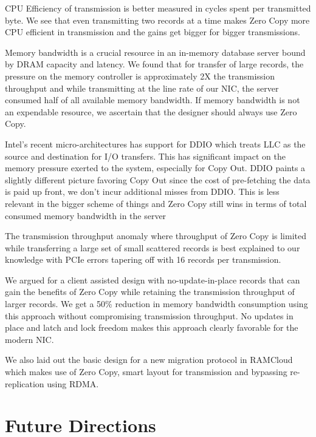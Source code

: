 CPU Efficiency of transmission is better measured in cycles spent per transmitted byte. We see that even transmitting two records at a time makes 
Zero Copy more CPU efficient in transmission and the gains get bigger for bigger transmissions.

Memory bandwidth is a crucial resource in an in-memory database server bound by DRAM capacity and latency. We found that for transfer of large 
records, the pressure on the memory controller is approximately 2X the transmission throughput and while transmitting at the line rate of our NIC, 
the server consumed half of all available memory bandwidth. If memory bandwidth is not an expendable resource, we ascertain that the designer should 
always use Zero Copy.
  
Intel\textregistered's recent micro-architectures has support for DDIO which treats LLC as the source and destination for I/O transfers. This has significant impact on 
the memory pressure exerted to the system, especially for Copy Out. DDIO paints a slightly different picture favoring Copy Out since the cost of pre-fetching the data is 
paid up front, we don't incur additional misses from DDIO. This is less relevant in the bigger scheme of things and Zero Copy still wins in terms of total 
consumed memory bandwidth in the server
  
The transmission throughput anomaly where throughput of Zero Copy is limited while transferring a large set of small scattered records is best explained to 
our knowledge with PCIe errors tapering off with 16 records per transmission.
 
We argued for a client assisted design with no-update-in-place records that can gain the benefits of Zero Copy while retaining the transmission throughput of larger records. 
We get a 50\% reduction in memory bandwidth consumption using this approach without compromising transmission throughput. 
No updates in place and latch and lock freedom makes this approach clearly favorable for the modern NIC. 

We also laid out the basic design for a new migration protocol in RAMCloud which makes use of Zero Copy, smart layout for transmission and bypassing re-replication using 
RDMA.

\section{Future Directions}

